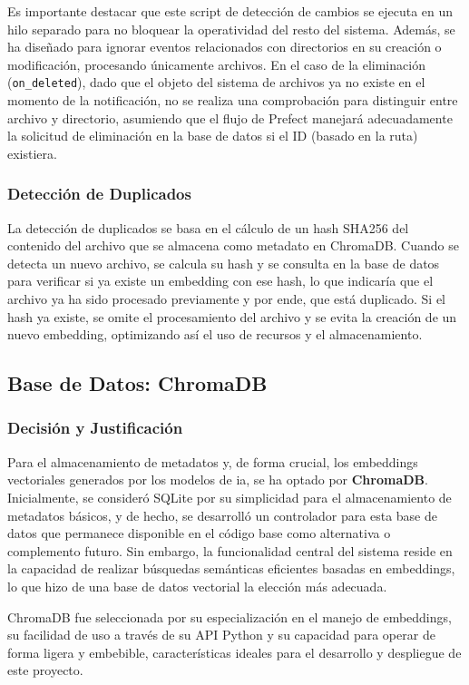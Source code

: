 Es importante destacar que este script de detección de cambios se ejecuta en un hilo separado para no bloquear la operatividad del resto del sistema. Además, se ha diseñado para ignorar eventos relacionados con directorios en su creación o modificación, procesando únicamente archivos. En el caso de la eliminación (\texttt{on\_deleted}), dado que el objeto del sistema de archivos ya no existe en el momento de la notificación, no se realiza una comprobación para distinguir entre archivo y directorio, asumiendo que el flujo de Prefect manejará adecuadamente la solicitud de eliminación en la base de datos si el ID (basado en la ruta) existiera.

\subsubsection{Detección de Duplicados}
La detección de duplicados se basa en el cálculo de un hash SHA256 del contenido del archivo que se almacena como metadato en ChromaDB. Cuando se detecta un nuevo archivo, se calcula su hash y se consulta en la base de datos para verificar si ya existe un embedding con ese hash, lo que indicaría que el archivo ya ha sido procesado previamente y por ende, que está duplicado. Si el hash ya existe, se omite el procesamiento del archivo y se evita la creación de un nuevo embedding, optimizando así el uso de recursos y el almacenamiento.

\subsection{Base de Datos: ChromaDB}
\label{subsec:decision_chromadb}
\subsubsection{Decisión y Justificación}
Para el almacenamiento de metadatos y, de forma crucial, los embeddings vectoriales generados por los modelos de \gls{ia}, se ha optado por \textbf{ChromaDB}. Inicialmente, se consideró SQLite por su simplicidad para el almacenamiento de metadatos básicos, y de hecho, se desarrolló un controlador para esta base de datos que permanece disponible en el código base como alternativa o complemento futuro. Sin embargo, la funcionalidad central del sistema reside en la capacidad de realizar búsquedas semánticas eficientes basadas en embeddings, lo que hizo de una base de datos vectorial la elección más adecuada.

ChromaDB fue seleccionada por su especialización en el manejo de embeddings, su facilidad de uso a través de su API Python y su capacidad para operar de forma ligera y embebible, características ideales para el desarrollo y despliegue de este proyecto.


